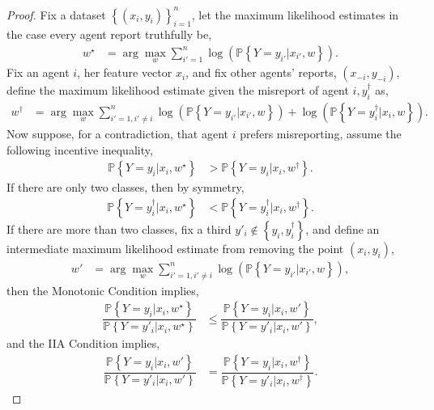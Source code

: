 \documentclass{article}
\begin{document}
\begin{proof} \label{proof:marginpf} 
Fix a dataset $\left\{\left(x_{i}, y_{i}\right)\right\}_{i=1}^{n}$, let the maximum likelihood estimates in the case every agent report truthfully be,
\begin{align*}
w^\star  &= \arg\displaystyle\max_{w} \displaystyle\sum_{i'=1}^{n} \log\left(\mathbb{P}\left\{Y = y_{i'} | x_{i'}, w\right\}\right).
\end{align*}
Fix an agent $i $, her feature vector $x_{i}$, and fix other agents' reports, $\left(x_{-i}, y_{-i}\right)$, define the maximum likelihood estimate given the misreport of agent $i , y^{\dagger}_{i}$ as,
\begin{align*}
w^{\dagger} &= \arg\displaystyle\max_{w} \displaystyle\sum_{i'=1, i' \neq  i}^{n} \log\left(\mathbb{P}\left\{Y = y_{i'} | x_{i'}, w\right\}\right) + \log\left(\mathbb{P}\left\{Y = y^{\dagger}_{i} | x_{i}, w\right\}\right).
\end{align*}
Now suppose, for a contradiction, that agent $i $ prefers misreporting, assume the following incentive inequality,
\begin{align*}
\mathbb{P}\left\{Y = y_{i} | x_{i}, w^\star \right\} &> \mathbb{P}\left\{Y = y_{i} | x_{i}, w^{\dagger}\right\}.
\end{align*}
If there are only two classes, then by symmetry,
\begin{align*}
\mathbb{P}\left\{Y = y^{\dagger}_{i} | x_{i}, w^\star \right\} &< \mathbb{P}\left\{Y = y^{\dagger}_{i} | x_{i}, w^{\dagger}\right\}.
\end{align*}
If there are more than two classes, fix a third $y'_{i} \notin \left\{y_{i}, y^{\dagger}_{i}\right\}$, and define an intermediate maximum likelihood estimate from removing the point $\left(x_{i}, y_{i}\right)$,
\begin{align*}
w' &= \arg\displaystyle\max_{w} \displaystyle\sum_{i'=1, i' \neq  i}^{n} \log\left(\mathbb{P}\left\{Y = y_{i'} | x_{i'}, w\right\}\right),
\end{align*}
then the Monotonic Condition implies,
\begin{align*}
\dfrac{\mathbb{P}\left\{Y = y_{i} | x_{i}, w^\star \right\}}{\mathbb{P}\left\{Y = y'_{i} | x_{i}, w^\star \right\}} &\leq  \dfrac{\mathbb{P}\left\{Y = y_{i} | x_{i}, w'\right\}}{\mathbb{P}\left\{Y = y'_{i} | x_{i}, w'\right\}},
\end{align*}
and the IIA Condition implies,
\begin{align*}
\dfrac{\mathbb{P}\left\{Y = y_{i} | x_{i}, w'\right\}}{\mathbb{P}\left\{Y = y'_{i} | x_{i}, w'\right\}} &= \dfrac{\mathbb{P}\left\{Y = y_{i} | x_{i}, w^{\dagger}\right\}}{\mathbb{P}\left\{Y = y'_{i} | x_{i}, w^{\dagger}\right\}}.

\end{align*}
\end{proof}
\end{document}
